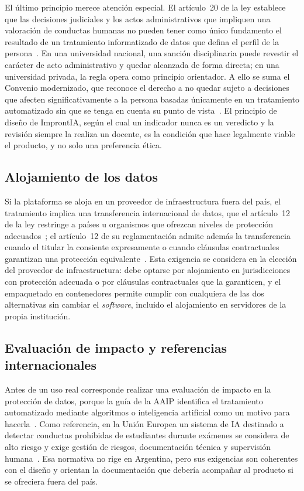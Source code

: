 El último principio merece atención especial. El artículo~20 de la ley establece que las decisiones judiciales y los actos administrativos que impliquen una valoración de conductas humanas no pueden tener como único fundamento el resultado de un tratamiento informatizado de datos que defina el perfil de la persona~\parencite{Argentina2000Ley25326}. En una universidad nacional, una sanción disciplinaria puede revestir el carácter de acto administrativo y quedar alcanzada de forma directa; en una universidad privada, la regla opera como principio orientador. A ello se suma el Convenio modernizado, que reconoce el derecho a no quedar sujeto a decisiones que afecten significativamente a la persona basadas únicamente en un tratamiento automatizado sin que se tenga en cuenta su punto de vista~\parencite{Argentina2022Ley27699}. El principio de diseño de ImprontIA, según el cual un indicador nunca es un veredicto y la revisión siempre la realiza un docente, es la condición que hace legalmente viable el producto, y no solo una preferencia ética.

\subsection{Alojamiento de los datos}

Si la plataforma se aloja en un proveedor de infraestructura fuera del país, el tratamiento implica una transferencia internacional de datos, que el artículo~12 de la ley restringe a países u organismos que ofrezcan niveles de protección adecuados~\parencite{Argentina2000Ley25326}; el artículo~12 de su reglamentación admite además la transferencia cuando el titular la consiente expresamente o cuando cláusulas contractuales garantizan una protección equivalente~\parencite{Argentina2001Dec1558}. Esta exigencia se considera en la elección del proveedor de infraestructura: debe optarse por alojamiento en jurisdicciones con protección adecuada o por cláusulas contractuales que la garanticen, y el empaquetado en contenedores permite cumplir con cualquiera de las dos alternativas sin cambiar el \textit{software}, incluido el alojamiento en servidores de la propia institución.

\subsection{Evaluación de impacto y referencias internacionales}

Antes de un uso real corresponde realizar una evaluación de impacto en la protección de datos, porque la guía de la AAIP identifica el tratamiento automatizado mediante algoritmos o inteligencia artificial como un motivo para hacerla~\parencite{AAIP2020GuiaEIPD}. Como referencia, en la Unión Europea un sistema de IA destinado a detectar conductas prohibidas de estudiantes durante exámenes se considera de alto riesgo y exige gestión de riesgos, documentación técnica y supervisión humana~\parencite{UE2024AIAct, UE2026AIOmnibus}. Esa normativa no rige en Argentina, pero sus exigencias son coherentes con el diseño y orientan la documentación que debería acompañar al producto si se ofreciera fuera del país.

